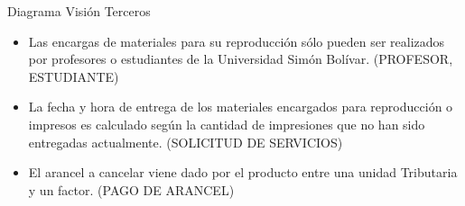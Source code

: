 \newline
\newline
Diagrama Visi\'on Terceros
\newline
\begin{itemize}
\item Las encargas de materiales para su reproducci\'on s\'olo pueden ser realizados por profesores o estudiantes de la Universidad Sim\'on Bol\'ivar. (PROFESOR, ESTUDIANTE)
\item La fecha y hora de entrega de los materiales encargados para reproducci\'on o impresos es calculado seg\'un la cantidad de impresiones que no han sido entregadas actualmente. (SOLICITUD DE SERVICIOS) 
\item El arancel a cancelar viene dado por el producto entre una unidad Tributaria y un factor. (PAGO DE ARANCEL)
\end{itemize}
